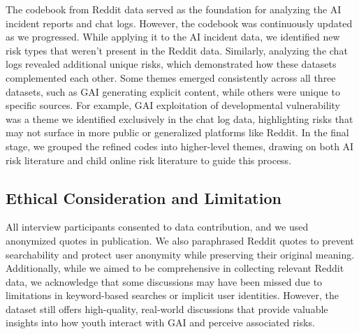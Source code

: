 The codebook from Reddit data served as the foundation for analyzing the AI incident reports and chat logs. However, the codebook was continuously updated as we progressed. While applying it to the AI incident data, we identified new risk types that weren't present in the Reddit data. Similarly, analyzing the chat logs revealed additional unique risks, which demonstrated how these datasets complemented each other. Some themes emerged consistently across all three datasets, such as GAI generating explicit content, while others were unique to specific sources. For example, GAI exploitation of developmental vulnerability was a theme we identified exclusively in the chat log data, highlighting risks that may not surface in more public or generalized platforms like Reddit. In the final stage, we grouped the refined codes into higher-level themes, drawing on both AI risk literature and child online risk literature to guide this process.


\vspace{-10pt}
\subsection{Ethical Consideration and Limitation}
All interview participants consented to data contribution, and we used anonymized quotes in publication. We also paraphrased Reddit quotes to prevent searchability and protect user anonymity while preserving their original meaning. Additionally, while we aimed to be comprehensive in collecting relevant Reddit data, we acknowledge that some discussions may have been missed due to limitations in keyword-based searches or implicit user identities. However, the dataset still offers high-quality, real-world discussions that provide valuable insights into how youth interact with GAI and perceive associated risks.


